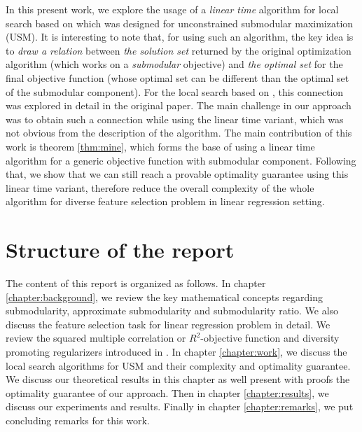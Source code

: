 In this present work, we explore the usage of a \emph{linear time} algorithm for local search based on \citealp{Buchbinder:2012:TLT:2417500.2417835} which was designed for unconstrained submodular maximization (USM). It is interesting to note that, for using such an algorithm, the key idea is to \emph{draw a relation} between \emph{the solution set} returned by the original optimization algorithm (which works on a \emph{submodular} objective) and \emph{the optimal set} for the final objective function (whose optimal set can be different than the optimal set of the submodular component). For the local search based on \citealp{Feige:2011:MNS:2079073.2079078}, this connection was explored in detail in the original paper. The main challenge in our approach was to obtain such a connection while using the linear time variant, which was not obvious from the description of the algorithm. The main contribution of this work is theorem \ref{thm:mine}, which forms the base of using  a linear time algorithm for a generic objective function with submodular component. Following that, we show that we can still reach a provable optimality guarantee using this linear time variant, therefore reduce the overall complexity of the whole algorithm for diverse feature selection problem in linear regression setting.

\section{Structure of the report}
The content of this report is organized as follows. In chapter \ref{chapter:background}, we review the key mathematical concepts regarding submodularity, approximate submodularity and submodularity ratio. We also discuss the feature selection task for linear regression problem in detail. We review the squared multiple correlation or $R^2$-objective function and diversity promoting regularizers introduced in \citealp{NIPS2012_4689}. In chapter \ref{chapter:work}, we discuss the local search algorithms for USM and their complexity and optimality guarantee. We discuss our theoretical results in this chapter as well present with proofs the optimality guarantee of our approach. Then in chapter \ref{chapter:results}, we discuss our experiments and results. Finally in chapter \ref{chapter:remarks}, we put concluding remarks for this work.
